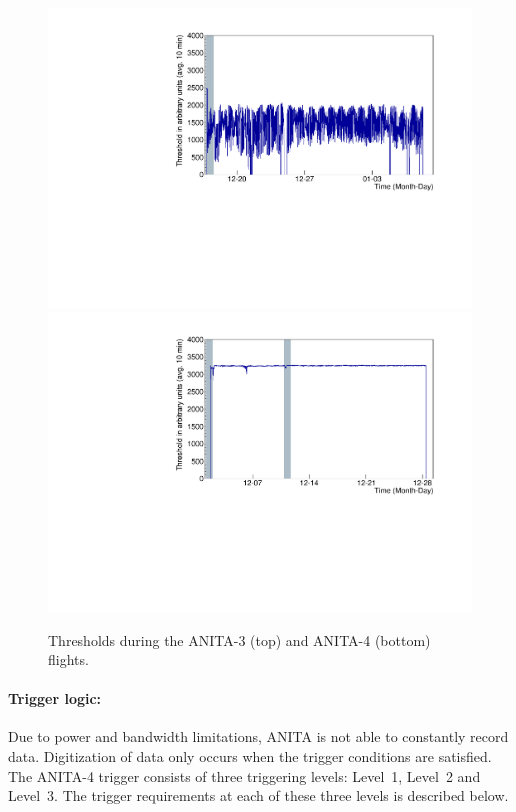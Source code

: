\begin{figure}
\centering
\includegraphics[width=1.0\textwidth]{figures/anita3_threshold_time20_2.pdf}
\includegraphics[width=1.0\textwidth]{figures/anita4_threshold_time_2.pdf}
\caption{Thresholds during the ANITA-3 (top) and ANITA-4 (bottom) flights.}
\label{thresholds_fig}
\end{figure}


\paragraph{Trigger logic:}
Due to power and bandwidth limitations, ANITA is not able to constantly record data. 
Digitization of data only occurs when the trigger conditions are satisfied.
The ANITA-4 trigger consists of three triggering levels: Level~1, Level~2 and Level~3. 
The trigger requirements at each of these three levels is described below.

